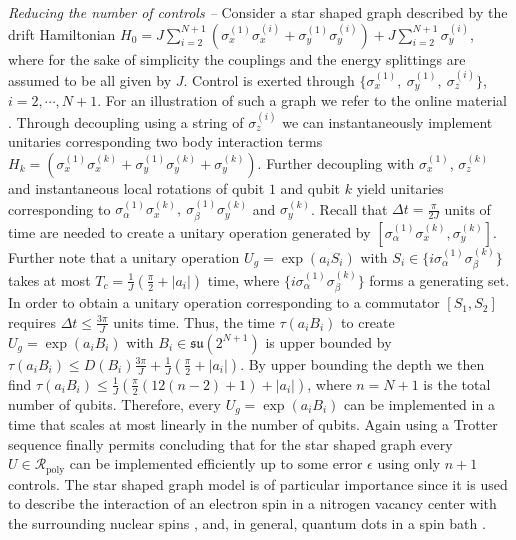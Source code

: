 \documentclass[aps,twocolumn,amsmath,amssymb,nofootinbib,superscriptaddress]{revtex4-1}
\begin{document}
\emph{Reducing the number of controls --} Consider a star shaped graph described by the drift Hamiltonian 
$H_{0}=J\sum_{i=2}^{N+1}(\sigma_{x}^{(1)}\sigma_{x}^{(i)}+\sigma_{y}^{(1)}\sigma_{y}^{(i)})+J\sum_{i=2}^{N+1}\sigma_{y}^{(i)}$,	 where for the sake of simplicity the couplings and the energy splittings are assumed to be all given by $J$. Control is exerted through $\{\sigma_{x}^{(1)},~\sigma_{y}^{(1)},~\sigma_{z}^{(i)}\}$,~$i=2,\cdots, N+1$.  For an illustration of such a graph we refer to the online material \cite{OnlineMaterial}. Through decoupling using a string of $\sigma_{z}^{(i)}$ we can instantaneously implement unitaries corresponding two body interaction terms $H_{k}=(\sigma_{x}^{(1)}\sigma_{x}^{(k)}+\sigma_{y}^{(1)}\sigma_{y}^{(k)}+\sigma_{y}^{(k)})$. Further decoupling with $\sigma_{x}^{(1)}$, $\sigma_{z}^{(k)}$ and instantaneous local rotations of qubit $1$ and qubit $k$ yield unitaries corresponding to $\sigma_{\alpha}^{(1)}\sigma_{x}^{(k)},~\sigma_{\beta}^{(1)}\sigma_{y}^{(k)}$ and $\sigma_{y}^{(k)}$. Recall that  $\Delta t=\frac{\pi}{2J}$ units of time are needed to create a unitary operation generated by $[\sigma_{\alpha}^{(1)}\sigma_{x}^{(k)},\sigma_{y}^{(k)}]$. Further note that a unitary operation $U_{g}=\exp(a_{i}S_{i})$ with $S_{i}\in\{i\sigma_{\alpha}^{(1)}\sigma_{\beta}^{(k)}\}$ takes at most $T_{c}=\frac{1}{J}(\frac{\pi}{2}+|a_{i}|)$ time, where $\{i\sigma_{\alpha}^{(1)}\sigma_{\beta}^{(k)}\}$ forms a generating set. In order to obtain a unitary operation corresponding to a commutator $[S_{1},S_{2}]$ requires $\Delta t\leq \frac{3\pi}{J}$ units time.  Thus, the time $\tau(a_{i}B_{i})$ to create $U_{g}=\exp(a_{i}B_{i})$ with $B_{i}\in \mathfrak{su}(2^{N+1})$ is upper bounded by $\tau(a_{i}B_{i})\leq D(B_{i})\frac{3\pi}{J}+\frac{1}{J}(\frac{\pi}{2}+|a_{i}|)$. By upper bounding the depth we then find
$	\tau(a_{i}B_{i})\leq \frac{1}{J}\left(\frac{\pi}{2}(12(n-2)+1)+|a_{i}|  \right)$,
 where $n=N+1$ is the total number of qubits. Therefore, every $U_{g}=\exp(a_{i}B_{i})$ can be implemented in a time that scales at most linearly in the number of qubits. Again using a Trotter sequence finally permits concluding that for the star shaped graph every $U\in \mathcal R_{\text{poly}}$ can be implemented efficiently up to some error $\epsilon$ using only $n+1$ controls. The star shaped graph model is of particular importance since it is used to describe the interaction of an electron spin in a nitrogen vacancy center with the surrounding nuclear spins \cite{NVmodel, NVmodel2, NVQuantum1, NVQuantumC2}, and, in general, quantum dots in a spin bath \cite{QubitSpinBath1, QubitSpinBath2, QubitSpinBath3}.     
\end{document}
